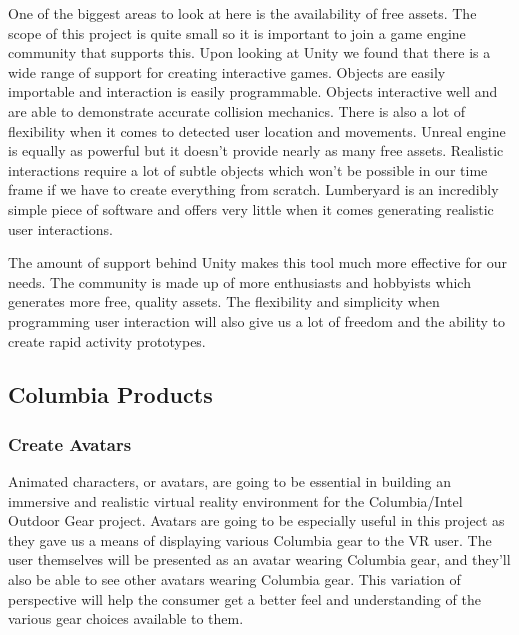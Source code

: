 \documentclass[10pt,journal,compsoc,onecolumn, draftclsnofoot]{IEEEtran}
\begin{document}
\begin{bibunit}
One of the biggest areas to look at here is the availability of free assets.
The scope of this project is quite small so it is important to join a game engine community that supports this.
Upon looking at Unity we found that there is a wide range of support for creating interactive games\cite{unity_getting_started}.
Objects are easily importable and interaction is easily programmable.
Objects interactive well and are able to demonstrate accurate collision mechanics.
There is also a lot of flexibility when it comes to detected user location and movements.
Unreal engine is equally as powerful\cite{unreal_animation} but it doesn’t provide nearly as many free assets.
Realistic interactions require a lot of subtle objects which won’t be possible in our time frame if we have to create everything from scratch.
Lumberyard is an incredibly simple piece of software and offers very little when it comes generating realistic user interactions\cite{lumberyard_object_system}.

The amount of support behind Unity makes this tool much more effective for our needs.
The community is made up of more enthusiasts and hobbyists which generates more free, quality assets.
The flexibility and simplicity when programming user interaction will also give us a lot of freedom and the ability to create rapid activity prototypes.
\vspace{2mm}


\subsection{Columbia Products}
\subsubsection{Create Avatars}
Animated characters, or avatars, are going to be essential in building an immersive and realistic virtual reality environment for the Columbia/Intel Outdoor Gear project. Avatars are going to be especially useful in this project as they gave us a means of displaying various Columbia gear to the VR user. The user themselves will be presented as an avatar wearing Columbia gear, and they'll also be able to see other avatars wearing Columbia gear. This variation of perspective will help the consumer get a better feel and understanding of the various gear choices available to them.


\end{bibunit}
\end{document}
